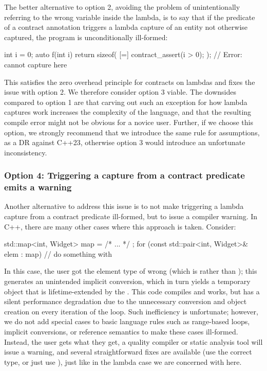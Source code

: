 The better alternative to option 2, avoiding the problem of unintentionally referring to the wrong variable inside the lambda, is to say that if the predicate of a contract annotation triggers a lambda capture of an entity not otherwise captured, the program is unconditionally ill-formed:
 
 \begin{codeblock}
int i = 0;
auto f(int i) {
  return sizeof( [=] { contract_assert(i > 0); } ); // Error: cannot capture  here 
}
\end{codeblock}

This satisfies the zero overhead principle for contracts on lambdas and fixes the issue with option 2. We therefore consider option 3 viable. The downsides compared to option 1 are that carving out  such an exception for how lambda captures work increases the complexity of the language, and that the resulting compile error might not be obvious for a novice user. Further, if we choose this option, we strongly recommend that we introduce the same rule for assumptions, as a DR against C++23, otherwise option 3 would introduce an unfortunate inconsistency.
 
\subsubsection{Option 4: Triggering a capture from a contract predicate emits a warning}

Another alternative to address this issue is to not make triggering a lambda capture from a contract predicate ill-formed, but to issue a compiler warning. In C++, there are many other cases where this approach is taken. Consider:

\begin{codeblock}
std::map<int, Widget> map = { /* ... */ };
for (const std::pair<int, Widget>& elem : map)
  // do something with 
\end{codeblock}

In this case, the user got the element type of  wrong (which is  rather than ); this generates an unintended implicit conversion, which in turn yields a temporary object that is lifetime-extended by the . This code compiles and works, but has a silent performance degradation due to the unnecessary conversion and object creation on every iteration of the loop. Such inefficiency is unfortunate; however, we do not add special cases to basic language rules such as range-based  loops, implicit conversions, or reference semantics to make these cases ill-formed. Instead, the user gets what they get, a quality compiler or static analysis tool will issue a warning, and several straightforward fixes are available (use the correct type, or just use ), just like in the lambda case we are concerned with here.

